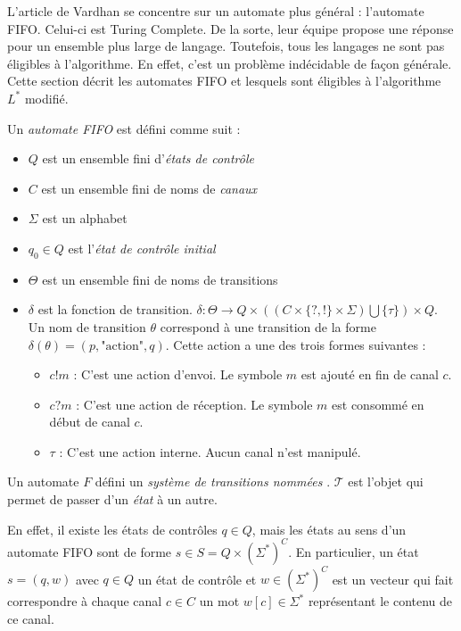 
L'article de Vardhan \cite{Vardhan04} se concentre sur un automate plus général : l'automate FIFO. Celui-ci est Turing Complete. De la sorte, leur équipe propose une réponse pour un ensemble plus large de langage. Toutefois, tous les langages ne sont pas éligibles à l'algorithme. En effet, c'est un problème indécidable de façon générale. Cette section décrit les automates FIFO et lesquels sont éligibles à l'algorithme $L^*$ modifié.

Un \emph{automate FIFO} \fifo est défini comme suit :
\begin{itemize}
  \item $Q$ est un ensemble fini d'\emph{états de contrôle}
  \item $C$ est un ensemble fini de noms de \emph{canaux}
  \item $\Sigma$ est un alphabet
  \item $q_0 \in Q$ est l'\emph{état de contrôle initial}
  \item $\Theta$ est un ensemble fini de noms de transitions
  \item $\delta$ est la fonction de transition. $\delta : \Theta \rightarrow Q \times ((C \times \{?,!\} \times \Sigma) \bigcup \{\tau\}) \times Q$. Un nom de transition $\theta$ correspond à une transition de la forme $\delta(\theta)=(p,\text{"action"},q)$. Cette action a une des trois formes suivantes :
  \begin{itemize}
    \item $c!m$ : C'est une action d'envoi. Le symbole $m$ est ajouté en fin de canal $c$.
    \item $c?m$ : C'est une action de réception. Le symbole $m$ est consommé en début de canal $c$.
    \item $\tau$ : C'est une action interne. Aucun canal n'est manipulé.
  \end{itemize}
\end{itemize}

Un automate $F$ défini un \emph{système de transitions nommées} \tsys. $\mathcal{T}$ est l'objet qui permet de passer d'un \emph{état} à un autre.

En effet, il existe les états de contrôles $q\in Q$, mais les états au sens d'un automate FIFO sont de forme $s \in S=Q\times(\Sigma^*)^C$. En particulier, un état $s=(q,w)$ avec $q\in Q$ un état de contrôle et $w\in (\Sigma^*)^C$ est un vecteur qui fait correspondre à chaque canal $c\in C$ un mot $w[c] \in \Sigma^*$ représentant le contenu de ce canal.

